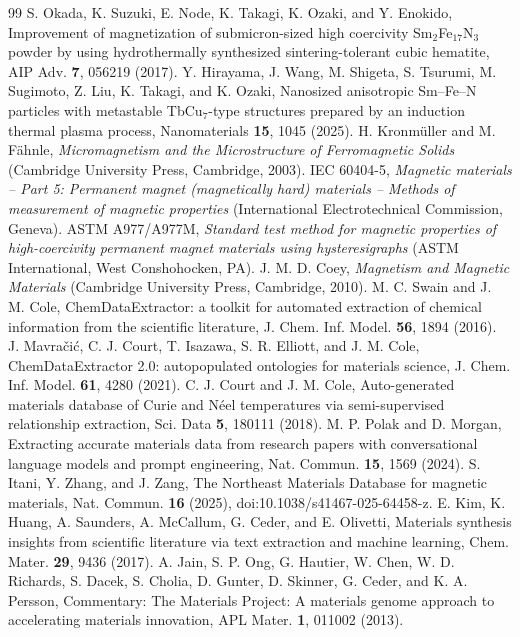 \documentclass[10pt,twocolumn,letterpaper]{article}
\begin{document}
\begin{thebibliography}{99}
 S. Okada, K. Suzuki, E. Node, K. Takagi, K. Ozaki, and Y. Enokido, Improvement of magnetization of submicron-sized high coercivity Sm$_2$Fe$_{17}$N$_3$ powder by using hydrothermally synthesized sintering-tolerant cubic hematite, AIP Adv. \textbf{7}, 056219 (2017).
 Y. Hirayama, J. Wang, M. Shigeta, S. Tsurumi, M. Sugimoto, Z. Liu, K. Takagi, and K. Ozaki, Nanosized anisotropic Sm--Fe--N particles with metastable TbCu$_7$-type structures prepared by an induction thermal plasma process, Nanomaterials \textbf{15}, 1045 (2025).
 H. Kronm\"uller and M. F\"ahnle, \textit{Micromagnetism and the Microstructure of Ferromagnetic Solids} (Cambridge University Press, Cambridge, 2003).
 IEC 60404-5, \textit{Magnetic materials -- Part 5: Permanent magnet (magnetically hard) materials -- Methods of measurement of magnetic properties} (International Electrotechnical Commission, Geneva).
 ASTM A977/A977M, \textit{Standard test method for magnetic properties of high-coercivity permanent magnet materials using hysteresigraphs} (ASTM International, West Conshohocken, PA).
 J. M. D. Coey, \textit{Magnetism and Magnetic Materials} (Cambridge University Press, Cambridge, 2010).
 M. C. Swain and J. M. Cole, ChemDataExtractor: a toolkit for automated extraction of chemical information from the scientific literature, J. Chem. Inf. Model. \textbf{56}, 1894 (2016).
 J. Mavra\v{c}i\'c, C. J. Court, T. Isazawa, S. R. Elliott, and J. M. Cole, ChemDataExtractor 2.0: autopopulated ontologies for materials science, J. Chem. Inf. Model. \textbf{61}, 4280 (2021).
 C. J. Court and J. M. Cole, Auto-generated materials database of Curie and N\'eel temperatures via semi-supervised relationship extraction, Sci. Data \textbf{5}, 180111 (2018).
 M. P. Polak and D. Morgan, Extracting accurate materials data from research papers with conversational language models and prompt engineering, Nat. Commun. \textbf{15}, 1569 (2024).
 S. Itani, Y. Zhang, and J. Zang, The Northeast Materials Database for magnetic materials, Nat. Commun. \textbf{16} (2025), doi:10.1038/s41467-025-64458-z.
 E. Kim, K. Huang, A. Saunders, A. McCallum, G. Ceder, and E. Olivetti, Materials synthesis insights from scientific literature via text extraction and machine learning, Chem. Mater. \textbf{29}, 9436 (2017).
 A. Jain, S. P. Ong, G. Hautier, W. Chen, W. D. Richards, S. Dacek, S. Cholia, D. Gunter, D. Skinner, G. Ceder, and K. A. Persson, Commentary: The Materials Project: A materials genome approach to accelerating materials innovation, APL Mater. \textbf{1}, 011002 (2013).

\end{thebibliography}
\end{document}
